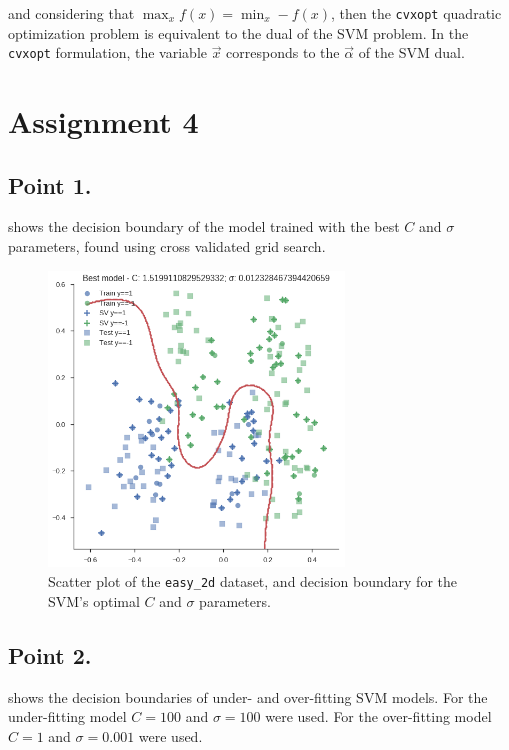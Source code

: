 \documentclass[a4paper,11pt]{article}
\begin{document}
and considering that $\max_{x} f(x) = \min_{x} -f(x)$, then the \verb|cvxopt| quadratic optimization problem is equivalent to the dual of the SVM problem. In the \verb|cvxopt| formulation, the variable $\vec{x}$ corresponds to the $\vec{\alpha}$ of the SVM dual.

\section*{Assignment 4}
\subsection*{Point 1.}

 shows the decision boundary of the model trained with the best $C$ and $\sigma$ parameters, found using cross validated grid search.

\begin{figure}
    \centering
    \includegraphics[width=0.7\textwidth]{images/assignment4_1.png}
    \caption{Scatter plot of the \texttt{easy\_2d} dataset, and decision boundary for the SVM's optimal $C$ and $\sigma$ parameters.}
    \label{fig:assignment4_1}
\end{figure}

\subsection*{Point 2.}

 shows the decision boundaries of under- and over-fitting SVM models.
For the under-fitting model $C=100$ and $\sigma=100$ were used.
For the over-fitting model $C=1$ and $\sigma=0.001$ were used.
\end{document}

